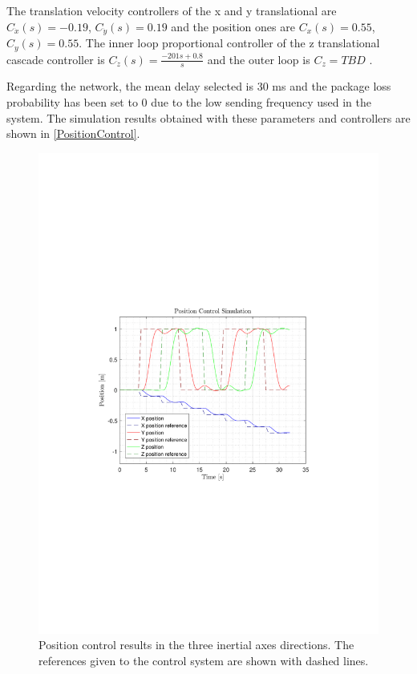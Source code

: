 The translation velocity controllers of the x and y translational are $C_{\dot{x}}(s)= -0.19$, $C_{\dot{y}}(s)= 0.19$ and the position ones are $C_x(s)= 0.55$, $C_y(s)= 0.55$. The inner loop proportional controller of the z translational cascade controller is
$C_{\dot{z}}(s)=\frac{-201s+0.8}{s}$ and the outer loop is $C_z=TBD$ .

Regarding the network, the mean delay selected is 30 ms and the package loss probability has been set to 0 due to the low sending frequency used in the system.
The simulation results obtained with these parameters and controllers are shown in \autoref{PositionControl}.
\begin{figure}[H]
	\centering
	\includegraphics[scale=0.25]{figures/PositionControl}
	\caption{Position control results in the three inertial axes directions. The references given to the control system are shown with dashed lines.}
	\label{PositionControl}
\end{figure}


